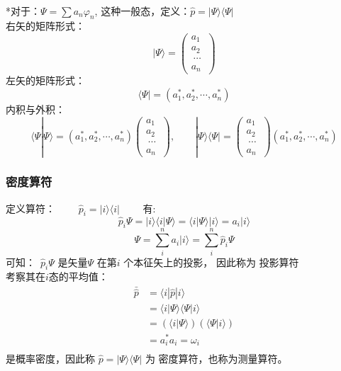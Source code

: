 \begin{frame}
    \frametitle{}
    ~~\\
    *对于：$ \Psi =\sum a_n \varphi_n $, 这种一般态，定义：$\hat{p} = |\Psi\rangle\langle \Psi |$\\
    右矢的矩阵形式：
    $$|\Psi\rangle = \begin{pmatrix}
        a_1\\
        a_2\\\
        \cdots\\
        a_n\
    \end{pmatrix}$$ 
    左矢的矩阵形式：
    $$ \langle\Psi| = (a_1 ^*, a_2 ^*, \cdots, a_n ^*) $$
    内积与外积：
    $$\langle\Psi|\Psi\rangle= (a_1 ^*, a_2 ^*, \cdots, a_n ^*) \begin{pmatrix}
        a_1\\
        a_2\\\
        \cdots\\
        a_n\
    \end{pmatrix},\qquad  |\Psi\rangle\langle\Psi|= \begin{pmatrix}
        a_1\\
        a_2\\\
        \cdots\\
        a_n\
    \end{pmatrix} (a_1 ^*, a_2 ^*, \cdots, a_n ^*) $$
\end{frame} 

\begin{frame}
    \frametitle{密度算符}
    定义算符： $ \qquad  \hat{p}_i = |i\rangle\langle i | \qquad $ 有: 
    $$ \hat{p}_i\Psi= |i\rangle\langle i | \Psi \rangle = \langle i | \Psi \rangle |i\rangle=a_i |i\rangle $$
    $$\Psi= \sum\limits_i ^n a_i |i\rangle = \sum\limits_i ^n \hat{p}_i\Psi$$
    可知： $ \hat{p}_i\Psi $ 是矢量$\Psi$ 在第$i$ 个本征矢上的投影， 因此称为{\color{red} 投影算符}\\
    考察其在$i$态的平均值：
    $$ \begin{aligned}
    \bar{\hat{p}} &=\langle i |\hat{p} | i \rangle \\
               &=\langle i |\Psi\rangle\langle \Psi | i \rangle \\
               &=(\langle i |\Psi\rangle) (\langle \Psi | i \rangle) \\
               &=a_i ^* a_i =\omega_i \\
    \end{aligned} $$
    是概率密度，因此称 $\hat{p} = |\Psi\rangle\langle \Psi |$ 为 {\color{red} 密度算符}，也称为测量算符。
\end{frame} 
 
